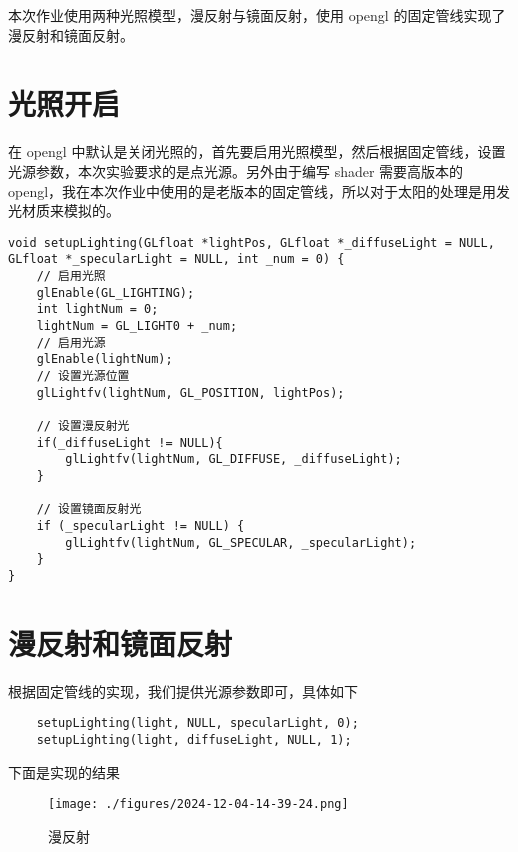 \documentclass[12pt,hyperref,a4paper,UTF8]{ctexart}
\begin{document}
\cover


\thispagestyle{empty} %

\newpage
\tableofcontents

\newpage
本次作业使用两种光照模型，漫反射与镜面反射，使用 opengl 的固定管线实现了漫反射和镜面反射。

\section{光照开启}
在 opengl 中默认是关闭光照的，首先要启用光照模型，然后根据固定管线，设置光源参数，本次实验要求的是点光源。另外由于编写 shader 需要高版本的 opengl，我在本次作业中使用的是老版本的固定管线，所以对于太阳的处理是用发光材质来模拟的。

\begin{verbatim}
void setupLighting(GLfloat *lightPos, GLfloat *_diffuseLight = NULL, GLfloat *_specularLight = NULL, int _num = 0) {
    // 启用光照
    glEnable(GL_LIGHTING);
    int lightNum = 0;
    lightNum = GL_LIGHT0 + _num;
    // 启用光源
    glEnable(lightNum);
    // 设置光源位置
    glLightfv(lightNum, GL_POSITION, lightPos);

    // 设置漫反射光
    if(_diffuseLight != NULL){
        glLightfv(lightNum, GL_DIFFUSE, _diffuseLight);
    }
    
    // 设置镜面反射光
    if (_specularLight != NULL) {
        glLightfv(lightNum, GL_SPECULAR, _specularLight);
    }
}
\end{verbatim}

\section{漫反射和镜面反射}
根据固定管线的实现，我们提供光源参数即可，具体如下

\begin{verbatim}
    setupLighting(light, NULL, specularLight, 0);
    setupLighting(light, diffuseLight, NULL, 1);
\end{verbatim}

下面是实现的结果

\begin{figure}[H]
    \centering
    \texttt{[image: ./figures/2024-12-04-14-39-24.png]}
    \caption{漫反射}
\end{figure}
\end{document}
